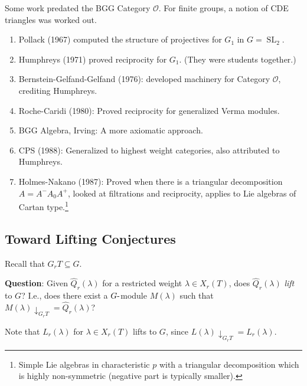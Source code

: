 \begin{remark}

Some work predated the BGG Category \({\mathcal{O}}\). For finite
groups, a notion of CDE triangles was worked out.

\begin{enumerate}
\def\labelenumi{\arabic{enumi}.}
\item
  Pollack (1967) computed the structure of projectives for \(G_1\) in
  \(G = {\operatorname{SL}}_2\).
\item
  Humphreys (1971) proved reciprocity for \(G_1\). (They were students
  together.)
\item
  Bernstein-Gelfand-Gelfand (1976): developed machinery for Category
  \({\mathcal{O}}\), crediting Humphreys.
\item
  Roche-Caridi (1980): Proved reciprocity for generalized Verma modules.
\item
  BGG Algebra, Irving: A more axiomatic approach.
\item
  CPS (1988): Generalized to highest weight categories, also attributed
  to Humphreys.
\item
  Holmes-Nakano (1987): Proved when there is a triangular decomposition
  \(A = A^- A_0 A^+\), looked at filtrations and reciprocity, applies to
  Lie algebras of Cartan type.\footnote{Simple Lie algebras in
    characteristic \(p\) with a triangular decomposition which is highly
    non-symmetric (negative part is typically smaller).}
\end{enumerate}

\end{remark}

\hypertarget{toward-lifting-conjectures}{%
\subsection{Toward Lifting
Conjectures}\label{toward-lifting-conjectures}}

Recall that \(G_r T \subseteq G\).

\textbf{Question}: Given \(\widehat{Q}_r(\lambda)\) for a restricted
weight \(\lambda \in X_r(T)\), does \(\widehat{Q}_r(\lambda)\)
\emph{lift} to \(G\)? I.e., does there exist a \(G{\hbox{-}}\)module
\(M(\lambda)\) such that
\(M(\lambda)\downarrow_{G_r T} = \widehat{Q}_r(\lambda)\)?

\begin{remark}

Note that \(L_r(\lambda)\) for \(\lambda\in X_r(T)\) lifts to \(G\),
since \(L(\lambda)\downarrow_{G_r T} = \widehat{L}_r(\lambda)\).

\end{remark}

